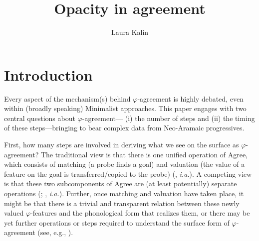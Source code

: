 \documentclass[output=paper
,modfonts
,nonflat]{langsci/langscibook}
\title{Opacity in agreement}
\author{Laura Kalin\affiliation{Princeton University}}
\begin{document}

\maketitle
\section{Introduction} \label{sec-kalin:1}

Every aspect of the mechanism(s) behind $\varphi$-agreement is highly debated, even within (broadly speaking) Minimalist approaches. This paper engages with two central questions about $\varphi$-agreement--- (i) the number of steps and (ii) the timing of these steps---bringing to bear complex data from Neo-Aramaic progressives.

First, how many steps are involved in deriving what we see on the surface as $\varphi$-agreement? The traditional view is that there is one unified operation of Agree, which consists of matching (a probe finds a goal) and valuation (the value of a feature on the goal is transferred/copied to the probe) (\citealt{Chomsky00,Chomsky01,Bejar03,Preminger11,Preminger14}, \textit{i.a.}). A competing view is that these two subcomponents of Agree are (at least potentially) separate operations (\citealt{vanKoppen07,BBP09,ArregiNevins12,BhattWalkow13,Bonet13,Marusicetal15, Smith17, AtlamazBakerTA}; , \textit{i.a.}). Further, once matching and valuation have taken place, it might be that there is a trivial and transparent relation between these newly valued $\varphi$-features and the phonological form that realizes them, or there may be yet further operations or steps required to understand the surface form of $\varphi$-agreement (see, e.g., \citealt{ArregiNevins12}).
\end{document}
